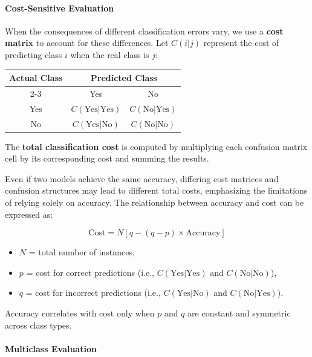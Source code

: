 \paragraph*{Cost-Sensitive Evaluation}

When the consequences of different classification errors vary, we use a \textbf{cost matrix} to account for these differences. Let $C(i|j)$ represent the cost of predicting class $i$ when the real class is $j$:

\begin{table}[h]
\centering
\begin{tabular}{|c|c|c|}
\hline
\multirow{2}{*}{\textbf{Actual Class}} & \multicolumn{2}{c|}{\textbf{Predicted Class}} \\
\cline{2-3}
& Yes & No \\
\hline
Yes & $C(\text{Yes}|\text{Yes})$ & $C(\text{No}|\text{Yes})$ \\
\hline
No & $C(\text{Yes}|\text{No})$ & $C(\text{No}|\text{No})$ \\
\hline
\end{tabular}
\end{table}

The \textbf{total classification cost} is computed by multiplying each confusion matrix cell by its corresponding cost and summing the results.

Even if two models achieve the same accuracy, differing cost matrices and confusion structures may lead to different total costs, emphasizing the limitations of relying solely on accuracy.
The relationship between accuracy and cost can be expressed as:

\begin{equation}
\text{Cost} = N \left[q - (q - p) \times \text{Accuracy} \right]
\end{equation}
\begin{itemize}
    \item $N$ = total number of instances,
    \item $p$ = cost for correct predictions (i.e., $C(\text{Yes}|\text{Yes})$ and $C(\text{No}|\text{No})$),
    \item $q$ = cost for incorrect predictions (i.e., $C(\text{Yes}|\text{No})$ and $C(\text{No}|\text{Yes})$).
\end{itemize}

Accuracy correlates with cost only when $p$ and $q$ are constant and symmetric across class types.

\paragraph*{Multiclass Evaluation}

